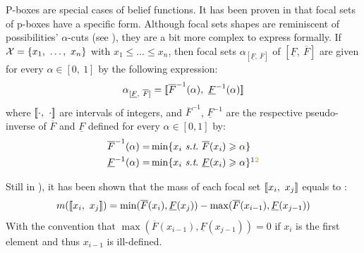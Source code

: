 \begin{definition}
    P-boxes are special cases of belief functions. It has been proven in \cite{destercke_unifying_2008} that focal sets of p-boxes have a specific form. Although focal sets shapes are reminiscent of possibilities' $\alpha$-cuts (see ), they are a bit more complex to express formally. If $\mathcal{X}=\{x_1, ~\dots, ~ x_n\}$ with $x_1\leqslant\dots\leqslant x_n$, then focal sets $\alpha_{[\underline{F}, ~\overline{F}]}$ of $[\underline{F}, ~\overline{F}]$ are given for every $\alpha\in[0,~1]$ by the following expression:
    \begin{align}
        \alpha_{[\underline{F}, ~\overline{F}]}= [\![ \overline{F}^{-1}(\alpha),~\underline{F}^{-1}(\alpha)]\!]\label{eq:pbox_focal_set}
    \end{align}
    where $[\![\cdot,~\cdot]\!]$ are intervals of integers, and $\overline{F}^{-1}$, $\underline{F}^{-1}$ are the respective pseudo-inverse of $\overline{F}$ and $\underline{F}$ defined for every $\alpha\in[0,1]$ by:
    \begin{align*}
        \overline{F}^{-1}(\alpha) =& \min \{x_i ~\st ~\overline{F}(x_i)\geqslant \alpha\}\\
        \underline{F}^{-1}(\alpha) =& \min \{x_i ~\st ~\underline{F}(x_i)\geqslant \alpha\}\commanue{c'est pas un max?}\comloic{alors de ce que je comprends grace à la figure 2.3 (parce que bon avec le texte j'y étais pas non plus), c'est un max seulement si on cherche xi tel que Funder <= xi. Du coup ça a l'air ok.}
    \end{align*}
    
    Still in \cite{destercke_unifying_2008}), it has been shown that the mass of each focal set $[\![ x_i, ~x_j]\!]$ equals to :
    \begin{align}
        m([\![ x_i, ~x_j]\!]) = \min(\overline{F}(x_i), \underline{F}(x_j)) - \max(\overline{F}(x_{i-1}), \underline{F}(x_{j-1}))
    \end{align}
    With the convention that $\max(\overline{F}(x_{i-1}), \underline{F}(x_{j-1}))=0$ if $x_{i}$ is the first element and thus $x_{i-1}$ is ill-defined. 
\end{definition}

